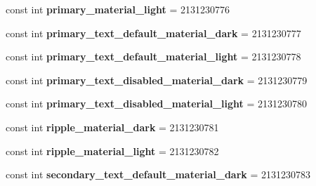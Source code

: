 \begin{DoxyCompactItemize}
\item 
\hypertarget{classClient_1_1Droid_1_1Resource_1_1Color_a642309881ed38e66d3eeb40f4d56060a}{}const int {\bfseries primary\+\_\+material\+\_\+light} = 2131230776\label{classClient_1_1Droid_1_1Resource_1_1Color_a642309881ed38e66d3eeb40f4d56060a}

\item 
\hypertarget{classClient_1_1Droid_1_1Resource_1_1Color_aef8452ad01116ed8b7573b65a3017df9}{}const int {\bfseries primary\+\_\+text\+\_\+default\+\_\+material\+\_\+dark} = 2131230777\label{classClient_1_1Droid_1_1Resource_1_1Color_aef8452ad01116ed8b7573b65a3017df9}

\item 
\hypertarget{classClient_1_1Droid_1_1Resource_1_1Color_afc5b58f8ae97aee6b05cd587aa94c135}{}const int {\bfseries primary\+\_\+text\+\_\+default\+\_\+material\+\_\+light} = 2131230778\label{classClient_1_1Droid_1_1Resource_1_1Color_afc5b58f8ae97aee6b05cd587aa94c135}

\item 
\hypertarget{classClient_1_1Droid_1_1Resource_1_1Color_ac0eedadbe9358b33203d2de78326765a}{}const int {\bfseries primary\+\_\+text\+\_\+disabled\+\_\+material\+\_\+dark} = 2131230779\label{classClient_1_1Droid_1_1Resource_1_1Color_ac0eedadbe9358b33203d2de78326765a}

\item 
\hypertarget{classClient_1_1Droid_1_1Resource_1_1Color_a17cb3813453dda73ea41d7f6d7d85afe}{}const int {\bfseries primary\+\_\+text\+\_\+disabled\+\_\+material\+\_\+light} = 2131230780\label{classClient_1_1Droid_1_1Resource_1_1Color_a17cb3813453dda73ea41d7f6d7d85afe}

\item 
\hypertarget{classClient_1_1Droid_1_1Resource_1_1Color_a97a0ae984f93862b953d33ed1aeaa9be}{}const int {\bfseries ripple\+\_\+material\+\_\+dark} = 2131230781\label{classClient_1_1Droid_1_1Resource_1_1Color_a97a0ae984f93862b953d33ed1aeaa9be}

\item 
\hypertarget{classClient_1_1Droid_1_1Resource_1_1Color_a68558e03d62ef75c63e75af06affcb91}{}const int {\bfseries ripple\+\_\+material\+\_\+light} = 2131230782\label{classClient_1_1Droid_1_1Resource_1_1Color_a68558e03d62ef75c63e75af06affcb91}

\item 
\hypertarget{classClient_1_1Droid_1_1Resource_1_1Color_a837365f712d36eb8a50eaa0e7dd50bd2}{}const int {\bfseries secondary\+\_\+text\+\_\+default\+\_\+material\+\_\+dark} = 2131230783\label{classClient_1_1Droid_1_1Resource_1_1Color_a837365f712d36eb8a50eaa0e7dd50bd2}


\end{DoxyCompactItemize}
